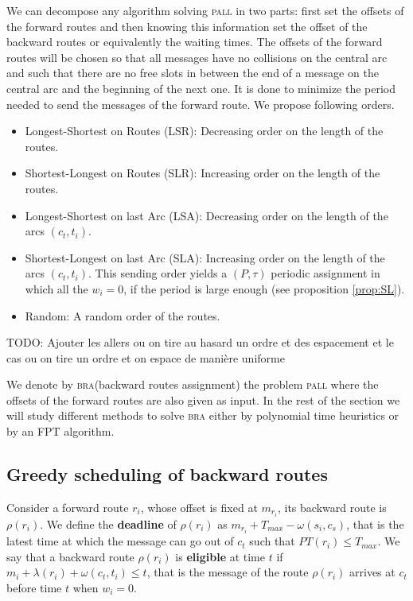 \documentclass[10pt, conference, letterpaper]{IEEEtran}
\newcommand{\todo}[1]{{\color{red} TODO: {#1}}}
\newcommand\pall{\textsc{pall}\xspace}
\newcommand\bra{\textsc{bra}\xspace}
\begin{document}
     We can decompose any algorithm solving \pall in two parts: first set the offsets of the forward routes and then knowing this information set the offset of the backward routes or equivalently the waiting times.      
     The offsets of the forward routes will be chosen so that all messages have no collisions on the central arc and such that there are no free slots in between the end of a message on the central arc and the beginning of the next one. 
     It is done to minimize the period needed to send the messages of the forward route.
     We propose following orders. 
	\begin{itemize}
	 
	 \item Longest-Shortest on Routes (LSR): Decreasing order on the length of the routes.
	 \item Shortest-Longest on Routes (SLR): Increasing order on the length of the routes. 
	 \item Longest-Shortest on last Arc (LSA): Decreasing order on the length of the arcs $(c_t,t_i)$.
	 \item Shortest-Longest on last Arc (SLA): Increasing order on the length of the arcs $(c_t,t_i)$. This sending order yields a $(P,\tau)$ periodic assignment in which all the $w_i = 0$, if the period is large enough (see proposition \ref{prop:SL}).
	 \item Random: A random order of the routes.
	\end{itemize}

   \todo{Ajouter les allers ou on tire au hasard un ordre et des espacement et le cas ou on tire un ordre et on espace de manière uniforme}
	
	
    We denote by \bra (backward routes assignment) the problem \pall where the offsets of the forward routes are also given as input.
    In the rest of the section we will study different methods to solve \bra either by polynomial time heuristics or by an FPT algorithm. 
   
   \subsection{Greedy scheduling of backward routes}
    
    Consider a forward route $r_i$, whose offset is fixed at $m_{r_i}$, its backward route is $\rho(r_i)$.
    We define the {\bf deadline} of $\rho(r_i)$ as $m_{r_i} + T_{max} - \omega(s_i,c_s)$, that is the latest time at which the message can go out of $c_t$ such that $PT(r_i) \leq T_{max}$.
    We say that a backward route $\rho(r_i)$ is {\bf eligible} at time $t$ if $m_{i} +  \lambda(r_i) + \omega(c_t,t_i) \leq t$, that is the message of the route $\rho(r_i)$ arrives at $c_t$ before time $t$ when $w_i = 0$.
    
\end{document}
